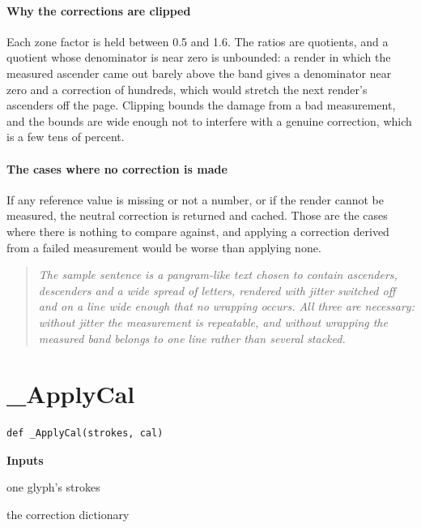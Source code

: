 \paragraph{Why the corrections are clipped}
Each zone factor is held between 0.5 and 1.6. The ratios are quotients, and a quotient whose denominator is near zero is unbounded: a render in which the measured ascender came out barely above the band gives a denominator near zero and a correction of hundreds, which would stretch the next render's ascenders off the page. Clipping bounds the damage from a bad measurement, and the bounds are wide enough not to interfere with a genuine correction, which is a few tens of percent.


\paragraph{The cases where no correction is made}
If any reference value is missing or not a number, or if the render cannot be measured, the neutral correction is returned and cached. Those are the cases where there is nothing to compare against, and applying a correction derived from a failed measurement would be worse than applying none.


\begin{quote}\small\itshape The sample sentence is a pangram-like text chosen to contain ascenders, descenders and a wide spread of letters, rendered with jitter switched off and on a line wide enough that no wrapping occurs. All three are necessary: without jitter the measurement is repeatable, and without wrapping the measured band belongs to one line rather than several stacked.\end{quote}

\section{\_ApplyCal}
\begin{lstlisting}[style=sig]
def _ApplyCal(strokes, cal)
\end{lstlisting}

\noindent\textbf{Inputs}
\begin{description}[leftmargin=2.2em,style=nextline,font=\normalfont\ttfamily]\setlength\itemsep{1pt}
  \item[{strokes}] \normalfont one glyph's strokes
  \item[{cal}] \normalfont the correction dictionary
\end{description}

